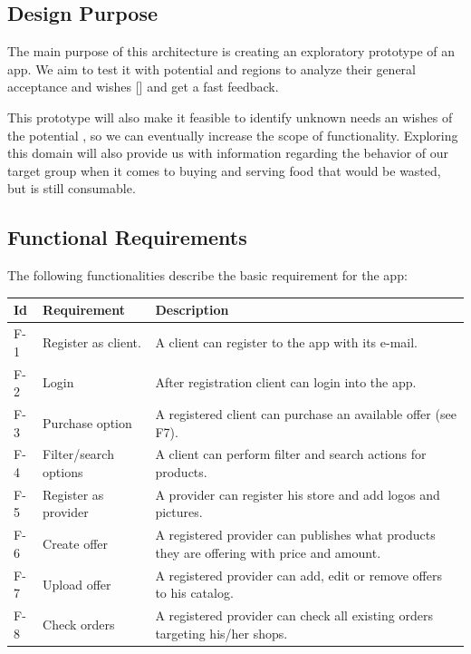 \subsection{Design Purpose}

The main purpose of this architecture is creating an exploratory prototype of an \gls{app}. We aim to test it with potential 
 and regions to analyze their general acceptance and wishes [\cite{refbook:DSHC}] and get a fast feedback. 

This prototype will also make it feasible to identify unknown needs an wishes of the potential , so we 
can eventually increase the scope of functionality. Exploring this domain will also provide us with information regarding 
the behavior of our target group when it comes to buying and serving food that would be wasted, but is still consumable.

\subsection{Functional Requirements} \label{Requirement_Overview}

The following functionalities describe the basic requirement for the \gls{app}:

\begin{table}[H]
    \begin{tabularx}{\textwidth}{llX}
    \toprule
    Id & Requirement & Description  \\
    \midrule
    F-1 & Register as \gls{client}. & A \gls{client} can register to the app with its e-mail.\\
    F-2 & Login & After registration \gls{client} can login into the app. \\
    F-3 & Purchase option & A registered \gls{client} can purchase an available offer (see F7).\\
    F-4 & Filter/search options & A \gls{client} can perform filter and search actions for products.\\
    F-5 & Register as \gls{provider} & A \gls{provider} can register his store and add logos and pictures.\\
    F-6 & Create offer & A registered \gls{provider} can publishes what products they are offering with price 
    and amount. \\
    F-7 & Upload offer & A registered \gls{provider} can add, edit or remove offers to his catalog.\\
    F-8 & Check orders & A registered \gls{provider} can check all existing orders targeting his/her shops.\\
    \bottomrule
    \end{tabularx}
\end{table}

